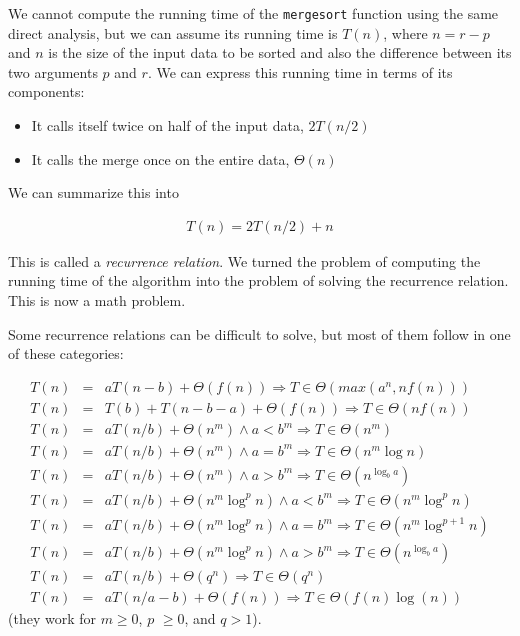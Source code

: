 \documentclass[justified, sixbynine]{tufte-book}
\def\ft{\small\tt}
\theoremstyle{plain}%
\newtheorem * {corollary}{Corollary}
\theoremstyle{definition}
\theoremstyle{remark}
\newtheorem * {remark}{Remark}
\newtheorem * {note}{Note}
\begin{document}
\begin{fullwidth}
We cannot compute the running time of the {\ft mergesort} function using the same direct analysis, but we can assume its running time is $T(n)$, where $n=r-p$ and $n$ is the size of the input data to be sorted and also the difference between its two arguments $p$ and $r$. We can express this running time in terms of its components:
\begin{itemize}
\item It calls itself twice on half of the input data, $2T(n/2)$
\item It calls the merge once on the entire data, $\Theta(n)$
\end{itemize}

We can summarize this into

\begin{eqnarray}
T(n) = 2T(n/2) + n
\end{eqnarray}

This is called a {\it recurrence relation}. We turned the problem of computing the running time of the algorithm into the problem of solving the recurrence relation. This is now a math problem.

Some recurrence relations can be difficult to solve, but most of them follow in one of these categories:

\begin{eqnarray}
T(n) \!\!\!\!\!&=&\!\!\!\!\!aT(n-b)+\Theta (f(n))\Rightarrow T\!\in\! \Theta (max(a^n, nf(n))) \\
T(n) \!\!\!\!\!&=&\!\!\!\!\!T(b)+T(n-b-a)+\Theta(f(n))\Rightarrow T\!\in\! \Theta (nf(n)) \\
T(n) \!\!\!\!\!&=&\!\!\!\!\!aT(n/b)+\Theta (n^m)\land a<b^m\Rightarrow T\!\in\! \Theta (n^m) \\
T(n) \!\!\!\!\!&=&\!\!\!\!\!aT(n/b)+\Theta (n^m)\land a=b^m\Rightarrow T\!\in\! \Theta
(n^m\log n) \\
T(n) \!\!\!\!\!&=&\!\!\!\!\!aT(n/b)+\Theta (n^m)\land a>b^m\Rightarrow T\!\in\! \Theta
(n^{\log _ba}) \\
T(n) \!\!\!\!\!&=&\!\!\!\!\!aT(n/b)+\Theta (n^m\log ^pn)\land a<b^m\Rightarrow T\!\in\!
\Theta (n^m\log ^pn) \\
T(n) \!\!\!\!\!&=&\!\!\!\!\!aT(n/b)+\Theta (n^m\log ^pn)\land a=b^m\Rightarrow T\!\in\!
\Theta (n^m\log ^{p+1}n) \\
T(n) \!\!\!\!\!&=&\!\!\!\!\!aT(n/b)+\Theta (n^m\log ^pn)\land a>b^m\Rightarrow T\!\in\!
\Theta (n^{\log _ba}) \\
T(n) \!\!\!\!\!&=&\!\!\!\!\!aT(n/b)+\Theta (q^n)\Rightarrow T\!\in\! \Theta (q^n) \\
T(n) \!\!\!\!\!&=&\!\!\!\!\!aT(n/a-b)+\Theta (f(n)) \Rightarrow T\!\in\! \Theta (f(n)\log(n))
\end{eqnarray}
(they work for $m\geq 0$, $p$ $\geq 0$, and $q>1$).


\end{fullwidth}
\end{document}
